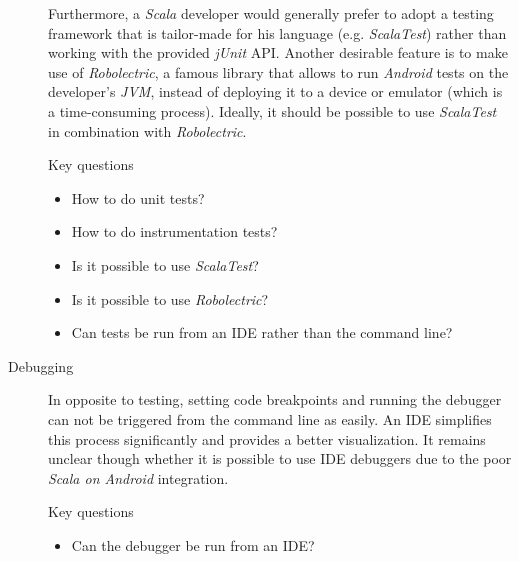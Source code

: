 \begin{description}
	Furthermore, a \textit{Scala} developer would generally prefer to adopt a testing framework that is tailor-made for his language (e.g. \textit{ScalaTest}) rather than working with the provided \textit{jUnit} \ac{API}. Another desirable feature is to make use of \textit{Robolectric}, a famous library that allows to run \textit{Android} tests on the developer's \textit{JVM}, instead of deploying it to a device or emulator (which is a time-consuming process). Ideally, it should be possible to use \textit{ScalaTest} in combination with \textit{Robolectric}.

	\begin{highlight}{Key questions}

		\begin{itemize}

			\item How to do unit tests?

			\item How to do instrumentation tests?

			\item Is it possible to use \textit{ScalaTest}?

			\item Is it possible to use \textit{Robolectric}?

			\item Can tests be run from an \ac{IDE} rather than the command line?

		\end{itemize}

	\end{highlight}

	\item[Debugging]\hfill

	In opposite to testing, setting code breakpoints and running the debugger can not be triggered from the command line as easily. An \ac{IDE} simplifies this process significantly and provides a better visualization. It remains unclear though whether it is possible to use \ac{IDE} debuggers due to the poor \textit{Scala on Android} integration.

	\begin{highlight}{Key questions}

		\begin{itemize}

			\item Can the debugger be run from an \ac{IDE}?

		\end{itemize}


\end{highlight}
\end{description}
